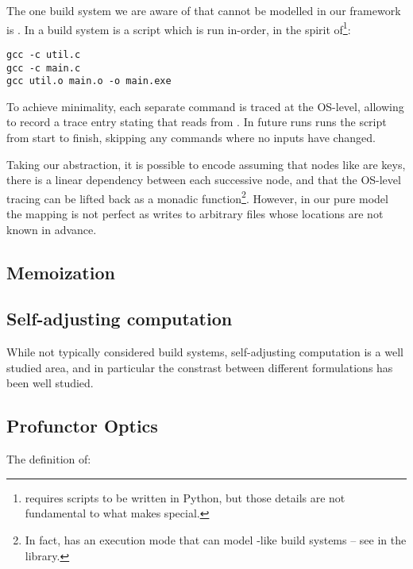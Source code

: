 The one build system we are aware of that cannot be modelled in our framework is \Fabricate \cite{fabricate}. In \Fabricate a build system is a script which is run in-order, in the spirit of\footnote{\Fabricate requires scripts to be written in Python, but those details are not fundamental to what makes \Fabricate special.}:

\begin{verbatim}
gcc -c util.c
gcc -c main.c
gcc util.o main.o -o main.exe
\end{verbatim}

To achieve minimality, each separate command is traced at the OS-level, allowing \Fabricate to record a trace entry stating that  reads from . In future runs \Fabricate runs the script from start to finish, skipping any commands where no inputs have changed.

Taking our abstraction, it is possible to encode \Fabricate assuming that nodes like  are keys, there is a linear dependency between each successive node, and that the OS-level tracing can be lifted back as a monadic  function\footnote{In fact, \Shake has an execution mode that can model \Fabricate{}-like build systems -- see  in the \Shake library.}. However, in our pure model the mapping is not perfect as  writes to arbitrary files whose locations are not known in advance.

\subsection{Memoization}


\subsection{Self-adjusting computation}

While not typically considered build systems, self-adjusting computation is a well studied area, and in particular the constrast between different formulations has been well studied. 

\subsection{Profunctor Optics}

The  definition of:

